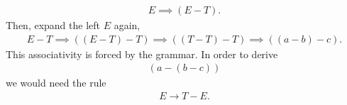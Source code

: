 \documentclass{report}
\begin{document}
\begin{itemize}
\begin{align*}
                E \implies (E - T)
            .\end{align*}
            Then, expand the left $E$ again,
            \begin{align*}
                E - T \implies ((E - T) - T) \implies ((T-T)-T) \implies ((a-b)-c)
            .\end{align*}
            This associativity is forced by the grammar. In order to derive 
            \begin{align*}
                (a-(b-c))
            \end{align*}
            we would need the rule 
            \begin{align*}
                E \to T - E
            .\end{align*}
        \end{itemize}
\end{document}
